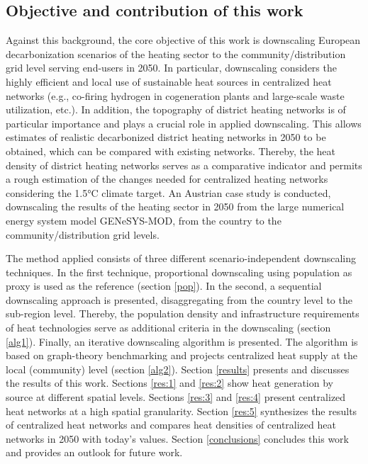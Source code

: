 \subsection{Objective and contribution of this work}
Against this background, the core objective of this work is downscaling European decarbonization scenarios of the heating sector to the community/distribution grid level serving end-users in 2050. In particular, downscaling considers the highly efficient and local use of sustainable heat sources in centralized heat networks (e.g., co-firing hydrogen in cogeneration plants and large-scale waste utilization, etc.). In addition, the topography of district heating networks is of particular importance and plays a crucial role in applied downscaling. This allows estimates of realistic decarbonized district heating networks in 2050 to be obtained, which can be compared with existing networks. Thereby, the heat density of district heating networks serves as a comparative indicator and permits a rough estimation of the changes needed for centralized heating networks considering the 1.5°C climate target. An Austrian case study is conducted, downscaling the results of the heating sector in 2050 from the large numerical energy system model GENeSYS-MOD, from the country to the community/distribution grid levels.\vspace{0.3cm}

The method applied consists of three different scenario-independent downscaling techniques. In the first technique, proportional downscaling using population as proxy is used as the reference (section \ref{pop}). In the second, a sequential downscaling approach is presented, disaggregating from the country level to the sub-region level. Thereby, the population density and infrastructure requirements of heat technologies serve as additional criteria in the downscaling (section \ref{alg1}). Finally, an iterative downscaling algorithm is presented. The algorithm is based on graph-theory benchmarking and projects centralized heat supply at the local (community) level (section \ref{alg2}). Section \ref{results} presents and discusses the results of this work. Sections \ref{res:1} and \ref{res:2} show heat generation by source at different spatial levels. Sections \ref{res:3} and \ref{res:4} present centralized heat networks at a high spatial granularity. Section \ref{res:5} synthesizes the results of centralized heat networks and compares heat densities of centralized heat networks in 2050 with today's values. Section \ref{conclusions} concludes this work and provides an outlook for future work. 



